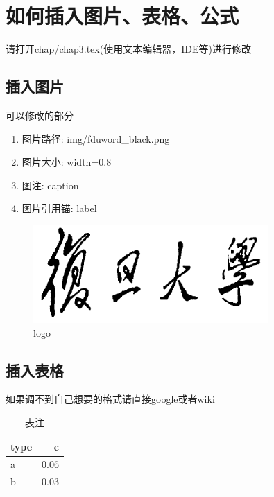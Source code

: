 \chapter{如何插入图片、表格、公式}\label{chap3}

请打开chap/chap3.tex(使用文本编辑器，IDE等)进行修改

\section{插入图片}

可以修改的部分
\begin{enumerate}
\item 图片路径: img/fduword\_black.png
\item 图片大小: width=0.8
\item 图注: caption
\item 图片引用锚: label
\end{enumerate}

\begin{figure}[!thbp]
    \begin{center}
    \includegraphics[width=0.8\textwidth]{img/fduword_black.png}
    \end{center}
    \caption{logo}
    \label{fig:fdulogo}
\end{figure}


\section{插入表格}

如果调不到自己想要的格式请直接google或者wiki


\begin{table}[h!]
  \begin{center}
    \caption{表注}
    \label{tab:example_tab}
    \begin{tabular}{l|r} %
      type & c \\
      \hline
      a & 0.06 \\
      b & 0.03 \\
    \end{tabular}
  \end{center}
\end{table}

